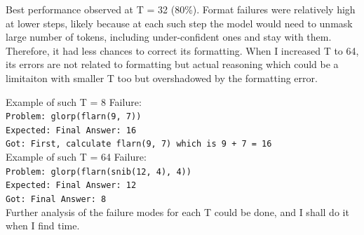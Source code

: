 Best performance observed at T = 32 (80\%). Format failures were relatively high at lower steps, likely because at each such step the model would need to unmask large number of tokens, including under-confident ones and stay with them. Therefore, it had less chances to correct its formatting. When I increased T to 64, its errors are not related to formatting but actual reasoning which could be a limitaiton with smaller T too but overshadowed by the formatting error.

Example of such T = 8 Failure: \\
\texttt{Problem: glorp(flarn(9, 7))} \\
\texttt{Expected: Final Answer: 16} \\
\texttt{Got: First, calculate flarn(9, 7) which is 9 + 7 = 16} \\

\vspace{0.5em}
Example of such T = 64 Failure: \\
\texttt{Problem: glorp(flarn(snib(12, 4), 4))} \\ \texttt{Expected: Final Answer: 12} \\
\texttt{Got: Final Answer: 8} \\

Further analysis of the failure modes for each T could be done, and I shall do it when I find time.